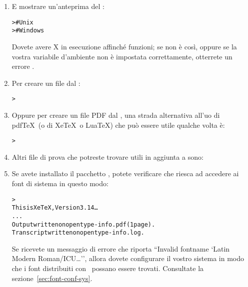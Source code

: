 \documentclass{article}
\begin{document}
\begin{enumerate}
\item E mostrare un'anteprima del \dvi:
\begin{alltt}
>     # Unix
>   # Windows
\end{alltt}
Dovete avere X in esecuzione affinché  funzioni;
se non è così, oppure se la vostra variabile d'ambiente
 non è impostata correttamente, otterrete un errore
.

\item Per creare un file \PS{} dal \dvi:
\begin{alltt}
> 
\end{alltt}

\item Oppure per creare un file PDF dal \dvi{}, una strada alternativa
all'uo di pdf\TeX\ (o di Xe\TeX\ o Lua\TeX) che può essere utile qualche
volta è:
\begin{alltt}
> 
\end{alltt}

\item Altri file di prova che potreste trovare utili in aggiunta a
 sono:


\item Se avete installato il pacchetto , potete verificare che
riesca ad accedere ai font di sistema in questo modo:
\begin{alltt}
> 
This is XeTeX, Version 3.14\dots
...
Output written on opentype-info.pdf (1 page).
Transcript written on opentype-info.log.
\end{alltt}

Se ricevete un messaggio di errore che riporta ``Invalid fontname `Latin
Modern Roman/ICU\dots'', allora dovete configurare il vostro sistema in
modo che i font distribuiti con \TL\ possano essere trovati. Consultate la
sezione~\ref{sec:font-conf-sys}.

\end{enumerate}
\end{document}
